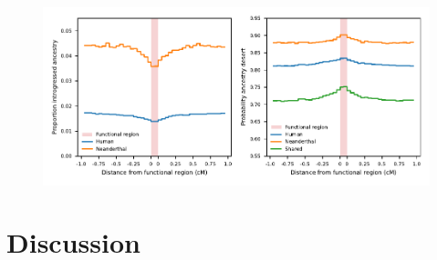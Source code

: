\documentclass{article}
\begin{document}
\begin{figure}[t!]
    \centering
    \includegraphics{../figures/introgression_deserts.SD_0.02.pdf}
    \caption{
        \textbf{}
    }
    \label{fig:deserts}
\end{figure}

\section*{Discussion}
\end{document}
